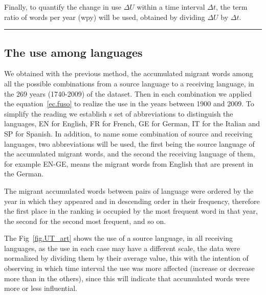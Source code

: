 \documentclass[10pt,letterpaper]{article} %
\begin{document}
	Finally, to quantify the change in use  $\Delta U$ within a time interval $\Delta t$, the term ratio of words per year (wpy) will be used, obtained by dividing $\Delta U$ by $\Delta t$.
	\noindent\rule{10cm}{0.4pt}
	
	
	\subsection*{The use among languages} %
	
	We obtained with the previous method, the accumulated migrant words among all the possible combinations from a source language to a receiving language, in the 269 years (1740-2009) of the dataset. Then in each combination we applied the equation~\ref{ec.fuso} to realize the use in the years between 1900 and 2009. To simplify the reading we establish s set of abbreviations to distinguish the languages, EN for English, FR for French, GE for German, IT for the Italian and SP for Spanish. In addition, to name some combination of source  and receiving languages, two abbreviations will be used, the first being the source language of the accumulated migrant words, and the second the receiving language of them, for example EN-GE, means the migrant words from English that are present in the German.
	
	The migrant accumulated words between pairs of language were ordered by the year in which they appeared and in descending order in their frequency, therefore the first place in the ranking is occupied by the most frequent word in that year, the second for the second most frequent, and so on.
	
	The Fig~\ref{fig.UT_art} shows the use of a source language, in all receiving languages, as the use in each case may have a different scale, the data were normalized by dividing them by their average value, this with the intention of observing in which time interval the use was more affected (increase or decrease more than in the others), since this will indicate that accumulated words were more or less influential. 
	
\end{document}
